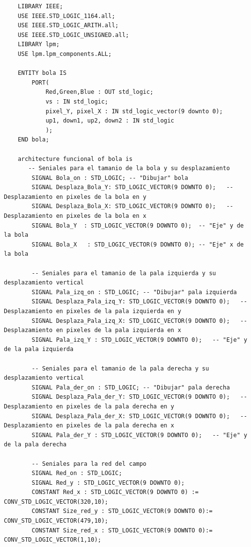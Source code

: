 \begin{lstlisting}
    LIBRARY IEEE;
    USE IEEE.STD_LOGIC_1164.all;
    USE IEEE.STD_LOGIC_ARITH.all;
    USE IEEE.STD_LOGIC_UNSIGNED.all;
    LIBRARY lpm;
    USE lpm.lpm_components.ALL;
    
    ENTITY bola IS
        PORT(
            Red,Green,Blue : OUT std_logic;
            vs : IN std_logic;
            pixel_Y, pixel_X : IN std_logic_vector(9 downto 0);
            up1, down1, up2, down2 : IN std_logic
            );
    END bola;
    
    architecture funcional of bola is
       -- Seniales para el tamanio de la bola y su desplazamiento
        SIGNAL Bola_on : STD_LOGIC;	-- "Dibujar" bola
        SIGNAL Desplaza_Bola_Y: STD_LOGIC_VECTOR(9 DOWNTO 0);	-- Desplazamiento en pixeles de la bola en y
        SIGNAL Desplaza_Bola_X: STD_LOGIC_VECTOR(9 DOWNTO 0);	-- Desplazamiento en pixeles de la bola en x
        SIGNAL Bola_Y  : STD_LOGIC_VECTOR(9 DOWNTO 0);	-- "Eje" y de la bola
        SIGNAL Bola_X	: STD_LOGIC_VECTOR(9 DOWNTO 0);	-- "Eje" x de la bola
        
        -- Seniales para el tamanio de la pala izquierda y su desplazamiento vertical	
        SIGNAL Pala_izq_on : STD_LOGIC;	-- "Dibujar" pala izquierda
        SIGNAL Desplaza_Pala_izq_Y: STD_LOGIC_VECTOR(9 DOWNTO 0);	-- Desplazamiento en pixeles de la pala izquierda en y
        SIGNAL Desplaza_Pala_izq_X: STD_LOGIC_VECTOR(9 DOWNTO 0);	-- Desplazamiento en pixeles de la pala izquierda en x
        SIGNAL Pala_izq_Y : STD_LOGIC_VECTOR(9 DOWNTO 0);	-- "Eje" y de la pala izquierda
        
        -- Seniales para el tamanio de la pala derecha y su desplazamiento vertical	
        SIGNAL Pala_der_on : STD_LOGIC;	-- "Dibujar" pala derecha
        SIGNAL Desplaza_Pala_der_Y: STD_LOGIC_VECTOR(9 DOWNTO 0);	-- Desplazamiento en pixeles de la pala derecha en y
        SIGNAL Desplaza_Pala_der_X: STD_LOGIC_VECTOR(9 DOWNTO 0);	-- Desplazamiento en pixeles de la pala derecha en x
        SIGNAL Pala_der_Y : STD_LOGIC_VECTOR(9 DOWNTO 0);	-- "Eje" y de la pala derecha
        
        -- Seniales para la red del campo
        SIGNAL Red_on : STD_LOGIC;
        SIGNAL Red_y : STD_LOGIC_VECTOR(9 DOWNTO 0);
        CONSTANT Red_x : STD_LOGIC_VECTOR(9 DOWNTO 0) := CONV_STD_LOGIC_VECTOR(320,10);
        CONSTANT Size_red_y : STD_LOGIC_VECTOR(9 DOWNTO 0):= CONV_STD_LOGIC_VECTOR(479,10);
        CONSTANT Size_red_x : STD_LOGIC_VECTOR(9 DOWNTO 0):= CONV_STD_LOGIC_VECTOR(1,10);
    

\end{lstlisting}
